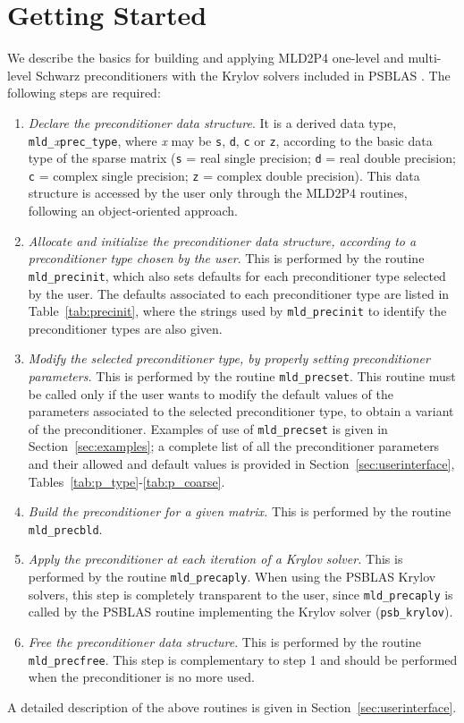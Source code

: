 \section{Getting Started\label{sec:started}}

We describe the basics for building and applying MLD2P4 one-level and multi-level
Schwarz preconditioners with the Krylov solvers included in PSBLAS \cite{}.
The following steps are required:
\begin{enumerate} 
\item \emph{Declare the preconditioner data structure}. It is a derived data type,
  \verb|mld_|\-\emph{x}\verb|prec_type|, where \emph{x} may be \verb|s|, \verb|d|, \verb|c|
	or \verb|z|, according to the basic data type of the sparse matrix
	(\verb|s| = real single precision; \verb|d| = real double precision;
	\verb|c| = complex single precision; \verb|z| = complex double precision).
	This data structure is accessed by the user only through the MLD2P4 routines,
	following an object-oriented approach.
\item \emph{Allocate and initialize the preconditioner data structure, according to
	a preconditioner type chosen by the user}. This is performed by the routine
	\verb|mld_precinit|, which also sets defaults for each preconditioner
	type selected by the user. The defaults associated to each preconditioner
	type are listed in Table~\ref{tab:precinit}, where the strings used by
	\verb|mld_precinit| to identify the preconditioner types are also given.
\item \emph{Modify the selected preconditioner type, by properly setting
  preconditioner parameters.} This is performed by the routine \verb|mld_precset|.
  This routine must be called only if the user wants to modify the default values
  of the parameters associated to the selected preconditioner type, to obtain a variant
  of the preconditioner.
  Examples of use of \verb|mld_precset| is given in Section~\ref{sec:examples};
  a complete list of all the
  preconditioner parameters and their allowed and default values is provided in 
  Section~\ref{sec:userinterface}, Tables~\ref{tab:p_type}-\ref{tab:p_coarse}. 
\item \emph{Build the preconditioner for a given matrix.} This is performed by
  the routine \verb|mld_precbld|.
\item \emph{Apply the preconditioner at each iteration of a Krylov solver.}
  This is performed by the routine \verb|mld_precaply|. When using the PSBLAS Krylov solvers,
  this step is completely transparent to the user, since \verb|mld_precaply| is called
  by the PSBLAS routine implementing the Krylov solver (\verb|psb_krylov|).
\item \emph{Free the preconditioner data structure}. This is performed by
  the routine \verb|mld_precfree|. This step is complementary to step 1 and should
  be performed when the preconditioner is no more used.
\end{enumerate}
A detailed description of the above routines is given in Section~\ref{sec:userinterface}.

